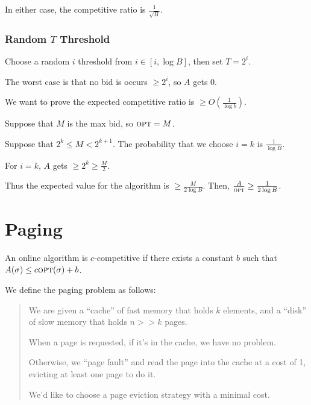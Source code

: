                     In either case, the competitive ratio is $\frac{1}{\sqrt{B}}$.
                \subsection{Random $T$ Threshold} %
                \label{sub:random_threshold}
                    Choose a random $i$ threshold from $i \in [i, \log B]$, then set $T = 2^i$.

                    The worst case is that no bid is occurs $\ge 2^i$, so $A$ gets $0$.

                    We want to prove the expected competitive ratio is $\ge O\left( \frac{1}{\log b} \right)$.

                    Suppose that $M$ is the max bid, so $\textsc{opt} = M$.

                    Suppose that $2^k \le M < 2^{k+1}$.
                    The probability that we choose $i=k$ is $\frac{1}{\log B}$.

                    For $i = k$, $A$ gets $\ge 2^k \ge \frac{M}{2}$.

                    Thus the expected value for the algorithm is $\ge \frac{M}{2 \log B}$.
                    Then, $\frac{A}{\textsc{opt}} \ge \frac{1}{2 \log B}$.
        \chapter{Paging} %
        \label{cha:paging}
            An online algorithm is $c$-competitive if there exists a constant $b$ such that $A(\sigma) \le c\textsc{opt}(\sigma) + b$.

            We define the paging problem as follows:
            \begin{quote}
                We are given a ``cache'' of fast memory that holds $k$ elements, and a ``disk'' of slow memory that holds $n >> k$ pages.

                When a page is requested, if it's in the cache, we have no problem.

                Otherwise, we ``page fault'' and read the page into the cache at a cost of 1, evicting at least one page to do it.

                We'd like to choose a page eviction strategy with a minimal cost.
            \end{quote}
